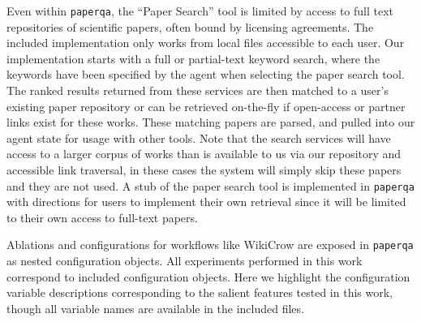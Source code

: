 \documentclass{article}
\begin{document}
Even within \texttt{paperqa}, the ``Paper Search'' tool is limited by access to full text repositories of scientific papers, often bound by licensing agreements. The included implementation only works from local files accessible to each user. Our implementation starts with a full or partial-text keyword search, where the keywords have been specified by the agent when selecting the paper search tool. The ranked results returned from these services are then matched to a user's existing paper repository or can be retrieved on-the-fly if open-access or partner links exist for these works. These matching papers are parsed, and pulled into our agent state for usage with other tools. Note that the search services will have access to a larger corpus of works than is available to us via our repository and accessible link traversal, in these cases the system will simply skip these papers and they are not used. A stub of the paper search tool is implemented in \texttt{paperqa} with directions for users to implement their own retrieval since it will be limited to their own access to full-text papers. 

Ablations and configurations for workflows like WikiCrow are exposed in \texttt{paperqa} as nested configuration objects. All experiments performed in this work correspond to included configuration objects. Here we highlight the configuration variable descriptions corresponding to the salient features tested in this work, though all variable names are available in the included files. 
\end{document}
